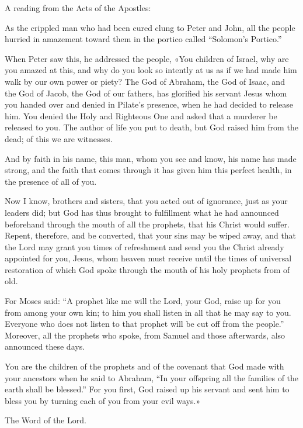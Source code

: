\indent A reading from the Acts of the Apostles:

As the crippled man who had been cured clung to Peter and John, all the people hurried in amazement toward them in the portico called “Solomon’s Portico.”

When Peter saw this, he addressed the people, «You children of Israel, why are you amazed at this, and why do you look so intently at us as if we had made him walk by our own power or piety? The God of Abraham, the God of Isaac, and the God of Jacob, the God of our fathers, has glorified his servant Jesus whom you handed over and denied in Pilate’s presence, when he had decided to release him. You denied the Holy and Righteous One and asked that a murderer be released to you. The author of life you put to death, but God raised him from the dead; of this we are witnesses.

And by faith in his name, this man, whom you see and know, his name has made strong, and the faith that comes through it has given him this perfect health, in the presence of all of you.

Now I know, brothers and sisters, that you acted out of ignorance, just as your leaders did; but God has thus brought to fulfillment what he had announced beforehand through the mouth of all the prophets, that his Christ would suffer. Repent, therefore, and be converted, that your sins may be wiped away, and that the Lord may grant you times of refreshment and send you the Christ already appointed for you, Jesus, whom heaven must receive until the times of universal restoration of which God spoke through the mouth of his holy prophets from of old.

For Moses said: “A prophet like me will the Lord, your God, raise up for you from among your own kin; to him you shall listen in all that he may say to you. Everyone who does not listen to that prophet will be cut off from the people.” Moreover, all the prophets who spoke, from Samuel and those afterwards, also announced these days.

You are the children of the prophets and of the covenant that God made with your ancestors when he said to Abraham, “In your offspring all the families of the earth shall be blessed.” For you first, God raised up his servant and sent him to bless you by turning each of you from your evil ways.»


The Word of the Lord.